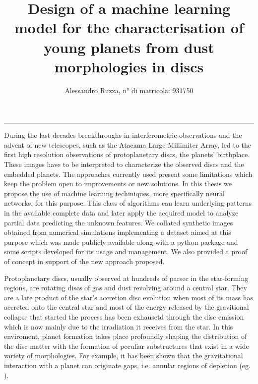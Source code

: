 \documentclass[a4paper,10pt, margin=1cm]{article}
\title{\fontsize{17}{17}\textbf{Design of a machine learning model for the characterisation of young planets from dust morphologies in discs}}
\author{Alessandro Ruzza, n° di matricola: 931750\vspace{-5em}}
\date{}
\begin{document}
\maketitle
\noindent\rule[0.5ex]{10cm}{1pt}

\vspace{2em}
During the last decades breakthroughs in interferometric observations 
and the advent of new telescopes, such as the Atacama Large Millimiter Array,  
led to the first high resolution observations of protoplanetary discs,
the planets' birthplace. These images have to be interpreted to characterize the observed discs and the
embedded planets.
The approaches currently used present some limitations which keep the problem open to improvements or new solutions.
In this thesis we propose the use of machine learning techiniques, more specifically neural networks, 
for this purpose.
This class of algorithms can learn underlying patterns in the available complete data
and later apply the acquired model to analyze partial data predicting the unknown features.
We collated synthetic images obtained from numerical simulations implementing a dataset aimed at this purpose which
was made publicly available along with a python package and some scripts developed for its usage and management.
We also provided a proof of concept in support of the new approach proposed.

Protoplanetary discs, usually observed at hundreds of parsec in the star-forming regions, 
are rotating discs of gas and dust revolving around a central star.
They are a late product of the star's accretion disc evolution when most of its mass has accreted onto
the central star and most of the energy released by the gravitional collapse that started the process has been exhausetd through 
the disc emission which is now mainly due to the irradiation it receives from the star.
In this enviroment, planet formation takes place profoundly shaping the distribution of the disc matter with the formation
of peculiar substructures that exist in a wide variety of morphologies.
For example, it has been shown that the gravitational interaction with a planet can originate gaps, i.e.
annular regions of depletion (eg. \citealt{gap_opening2,gap_opening3}).

\begin{comment}
To observe these discs three categories of emitted radiation are usually probed: the light scattered by micron-sized dust grains,
the molecular emission of CO or HD in the gas component and the dust thermal continuum emission in the millimetric 
which is the tracer probed in the simulations used in this thesis. 
Among the various tracers probed to obtain images 
\end{comment}
\end{document}
